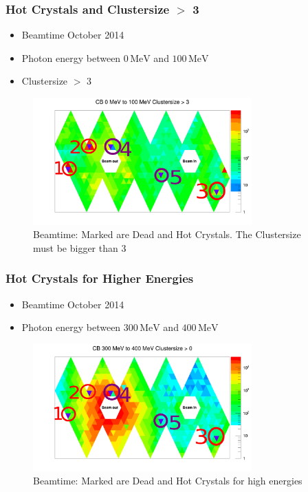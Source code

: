 \documentclass[slidestop,compress,mathserif]{beamer}
\begin{document}
\begin{frame}
	\frametitle{Hot Crystals and Clustersize $>$ 3}
	\begin{itemize}
		\item Beamtime October 2014
		\item Photon energy between $0\,\text{MeV}$ and $100\,\text{MeV}$
		\item Clustersize $>$ 3
	\end{itemize}

\begin{figure}
	\includegraphics[width=0.75\textwidth]{Pictures/20172404Clustersize3Map100MeV}
	\caption{Beamtime: Marked are Dead and Hot Crystals. The Clustersize must be bigger than 3}
\end{figure}

\end{frame}

\begin{frame}
	\frametitle{Hot Crystals for Higher Energies}
	\begin{itemize}
		\item Beamtime October 2014
		\item Photon energy between $300\,\text{MeV}$ and $400\,\text{MeV}$
	\end{itemize}
\begin{figure}
	\includegraphics[width=0.75\textwidth]{Pictures/20172404Clustersize0Map400MeV}
	\caption{Beamtime: Marked are Dead and Hot Crystals for high energies}
\end{figure}


\end{frame}
\end{document}

